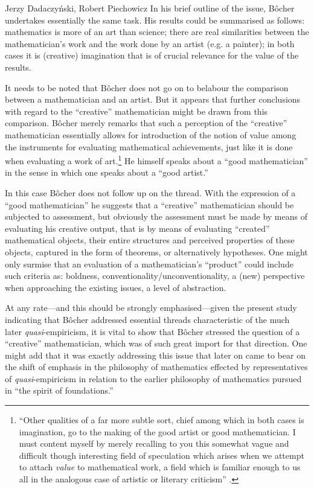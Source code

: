 \begin{artengenv}{Jerzy Dadaczyński, Robert Piechowicz}
In his brief outline of the issue, Bôcher undertakes essentially the same task. His results could be summarised as follows: mathematics is more of an art than science; there are real similarities between the mathematician's work and the work done by an artist (e.g. a painter); in both cases it is (creative) imagination that is of crucial relevance for the value of the results.

It needs to be noted that Bôcher does not go on to belabour the comparison between a mathematician and an artist. But it appears that further conclusions with regard to the ``creative'' mathematician might be drawn from this comparison. Bôcher merely remarks that such a perception of the ``creative'' mathematician essentially allows for introduction of the notion of value among the instruments for evaluating mathematical achievements, just like it is done when evaluating a work of art.\footnote{``Other qualities of a far more subtle sort, chief among which in both cases is imagination, go to the making of the good artist or good mathematician. I must content myself by merely recalling to you this somewhat vague and difficult though interesting field of speculation which arises when we attempt to attach \textit{value} to mathematical work, a field which is familiar enough to us all in the analogous case of artistic or literary criticism''
\parencite[][p.133]{bocher_fundamental_1904}.%
} He himself speaks about a ``good mathematician'' in the sense in which one speaks about a ``good artist.''

In this case Bôcher does not follow up on the thread. With the expression of a ``good mathematician'' he suggests that a ``creative'' mathematician should be subjected to assessment, but obviously the assessment must be made by means of evaluating his creative output, that is by means of evaluating ``created'' mathematical objects, their entire structures and perceived properties of these objects, captured in the form of theorems, or alternatively hypotheses. One might only surmise that an evaluation of a mathematician's ``product'' could include such criteria as: boldness, conventionality/unconventionality, a (new) perspective when approaching the existing issues, a level of abstraction.

At any rate---and this should be strongly emphasised---given the present study indicating that Bôcher addressed essential threads characteristic of the much later \textit{quasi}-empiricism, it is vital to show that Bôcher stressed the question of a ``creative'' mathematician, which was of such great import for that direction. One might add that it was exactly addressing this issue that later on came to bear on the shift of emphasis in the philosophy of mathematics effected by representatives of \textit{quasi}-empiricism in relation to the earlier philosophy of mathematics pursued in ``the spirit of foundations.''


\end{artengenv}
